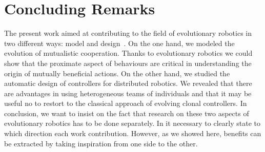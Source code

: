 \section{Concluding Remarks}

	The present work aimed at contributing to the field of evolutionary robotics in two different ways: model and design~\parencite{Trianni2014b, Doncieux2015a}. On the one hand, we modeled the evolution of mutualistic cooperation. Thanks to evolutionary robotics we could show that the proximate aspect of behaviours are critical in understanding the origin of mutually beneficial actions. On the other hand, we studied the automatic design of controllers for distributed robotics. We revealed that there are advantages in using heterogeneous teams of individuals and that it may be useful no to restort to the classical approach of evolving clonal controllers. In conclusion, we want to insist on the fact that research on these two aspects of evolutionary robotics has to be done separately. In it necessary to clearly state to which direction each work contribution. However, as we showed here, benefits can be extracted by taking inspiration from one side to the other. 


